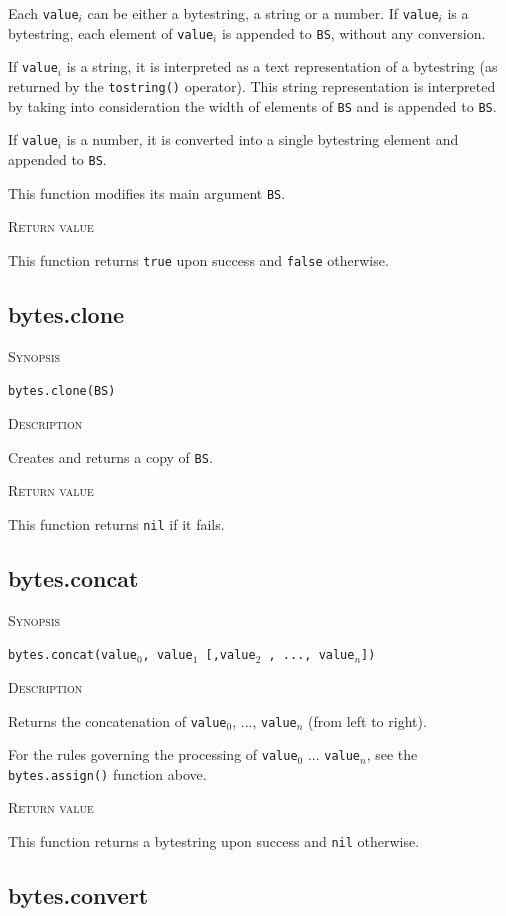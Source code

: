 \documentclass[11pt]{report}
\newcommand{\mansection}[1]{\vspace{0.5em}\par\noindent\textsc{#1}\vspace{0.5em}\par}
\newcommand{\syn}[1]{\texttt{#1}}
\begin{document}
  Each \syn{value$_i$} can be either a bytestring, a string or a number.
  If \syn{value$_i$} is a bytestring, each element of \syn{value$_i$} is appended to \syn{BS}, 
  without any conversion.

  If \syn{value$_i$} is a string, it is interpreted as a text representation of
  a bytestring (as returned by the \syn{tostring()} operator). This string
  representation is interpreted by taking into consideration the width 
  of elements of \syn{BS} and is appended to \syn{BS}.

  If \syn{value$_i$} is a number, it is converted into a single bytestring element and 
  appended to \syn{BS}.

  This function modifies its main argument \syn{BS}.

\mansection{Return value}

  This function returns \syn{true} upon success and \syn{false} otherwise.

\subsection{bytes.clone}

\mansection{Synopsis}
\syn{bytes.clone(BS)}

\mansection{Description}
  Creates and returns a copy of \syn{BS}.

\mansection{Return value}
  This function returns \syn{nil} if it fails.

\subsection{bytes.concat}

\mansection{Synopsis}
\syn{bytes.concat(\syn{value$_0$}, \syn{value$_1$} [,\syn{value$_2$} , ..., \syn{value$_n$}])}

\mansection{Description}
  Returns the concatenation of \syn{value$_0$}, ..., \syn{value$_n$} (from left to right).

  For the rules governing the processing of \syn{value$_0$} ... \syn{value$_n$}, see
  the \syn{bytes.assign()} function above.

\mansection{Return value}
  This function returns a bytestring upon success and \syn{nil} otherwise.

\subsection{bytes.convert}
\end{document}
